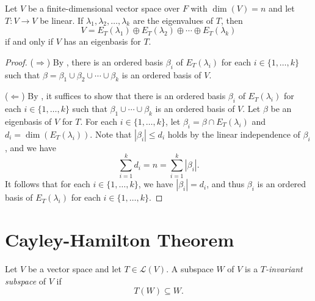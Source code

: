 \begin{theorem}
  Let $V$ be a finite-dimensional vector space over $F$ with $\dim(V) = n$ and
  let $T: V \to V$ be linear.
  If $\lambda_1, \lambda_2, \dots, \lambda_k$ are the eigenvalues of $T$, then
  \begin{equation*}
    V = E_T(\lambda_1) \oplus E_T(\lambda_2) \oplus \cdots \oplus
    E_T(\lambda_k)
  \end{equation*}
  if and only if $V$ has an eigenbasis for $T$.
\end{theorem}
\begin{proof}
  ($\Rightarrow$)
  By , there is an ordered basis $\beta_i$ of
  $E_T(\lambda_i)$ for each $i \in \{1, \dots, k\}$ such that
  $\beta = \beta_1 \cup \beta_2 \cup \cdots \cup \beta_k$ is an ordered basis
  of $V$.

  ($\Leftarrow$)
  By , it suffices to show that there is an ordered basis
  $\beta_i$ of $E_T(\lambda_i)$ for each $i \in \{1, \dots, k\}$ such that
  $\beta_1 \cup \cdots \cup \beta_k$ is an ordered basis of $V$.
  Let $\beta$ be an eigenbasis of $V$ for $T$.
  For each $i \in \{1, \dots, k\}$, let $\beta_i = \beta \cap E_T(\lambda_i)$
  and $d_i = \dim(E_T(\lambda_i))$.
  Note that $|\beta_i| \leq d_i$ holds by the linear independence of $\beta_i$,
  and we have
  \begin{equation*}
    \sum_{i=1}^k d_i = n = \sum_{i=1}^k |\beta_i|.
  \end{equation*}
  It follows that for each $i \in \{1, \dots, k\}$, we have $|\beta_i| = d_i$,
  and thus $\beta_i$ is an ordered basis of $E_T(\lambda_i)$ for each
  $i \in \{1, \dots, k\}$.
\end{proof}

\section{Cayley-Hamilton Theorem}
\begin{definition}
  Let $V$ be a vector space and let $T \in \mathcal{L}(V)$.
  A subspace $W$ of $V$ is a \emph{$T$-invariant subspace} of $V$ if
  \begin{equation*}
    T(W) \subseteq W.
  \end{equation*}
\end{definition}

